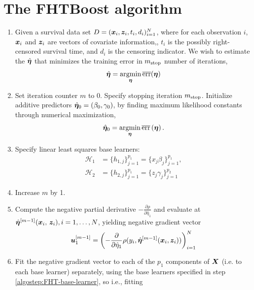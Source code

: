 \section{The FHTBoost algorithm}
\label{algo:fhtboost}
\begin{enumerate}
    \item
        Given a survival data set $D=(\bm{x}_i, \bm{z}_i, t_i,d_i)_{i=1}^N$, where for each observation $i$,
        $\bm{x}_i$ and $\bm{z}_i$ are vectors of covariate information,, $t_i$ is the possibly right-censored survival time, and $d_i$ is the censoring indicator.
        We wish to estimate the $\hat{\boldsymbol{\eta}}$ that minimizes the training error in $m_{\text{stop}}$ number of iterations,
        \begin{equation*}
            \hat{\boldsymbol{\eta}}=\operatorname*{argmin}_{\boldsymbol{\eta}}\overline{\text{err}}(\boldsymbol{\eta})
        \end{equation*}
    \item
        Set iteration counter $m$ to $0$.
        Specify stopping iteration $m_{\text{stop}}$.
        Initialize additive predictors $\hat{\boldsymbol{\eta}}_0=\left(\beta_{0},\gamma_{0}\right)$, by finding maximum likelihood constants through numerical maximization,
        \begin{equation*}
            \hat{\boldsymbol{\eta}}_0=\operatorname*{argmin}_{\boldsymbol{\eta}}\overline{\text{err}}\left(\boldsymbol{\eta}\right).
        \end{equation*}
    \item
    \label{algostep:FHT-base-learner}
        Specify linear least squares base learners:
        \begin{align*}
            \mathcal{H}_1&=\{h_{1,j}\}_{j=1}^{p_1}=\{x_j\beta_j\}_{j=1}^{p_1}, \\
            \mathcal{H}_2&=\{h_{2,j}\}_{j=1}^{p_1}=\{z_j\gamma_j\}_{j=1}^{p_2}
        \end{align*}
    \item
    \label{algostep:FHT-init}
        Increase $m$ by 1.
    \item
        Compute the negative partial derivative $-\frac{\partial\rho}{\partial \hat{\eta}_1}$
        and evaluate at $\hat{\boldsymbol{\eta}}^{[m-1]}(\bm{x}_i,\,\bm{z}_i),i=1,\ldots,N$, yielding negative gradient vector
        \begin{equation*}
            \bm{u}^{[m-1]}_1=\left(-\frac{\partial}{\partial \hat{\eta}_1}\rho(y_i, \hat{\boldsymbol{\eta}}^{[m-1]}(\bm{x}_i,\bm{z}_i))\right)_{i=1}^N
        \end{equation*}
    \item
        Fit the negative gradient vector to each of the $p_1$ components of $\bm{X}$ (i.e. to each base learner) separately, using the base learners specified in step \ref{algostep:FHT-base-learner}, so i.e., fitting

\end{enumerate}
